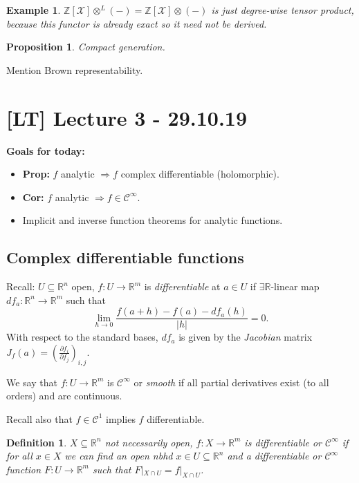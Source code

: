 \documentclass[12pt]{article}
\theoremstyle{darkgreentheorem}
\newtheorem{prop}[thm]{Proposition}
\theoremstyle{darkbluedefinition}
\newtheorem{defn}[thm]{Definition}
\theoremstyle{darkredexample}
\newtheorem{exa}[thm]{Example}
\theoremstyle{remark}
\newcommand{\Z}{\mathbb{Z}}
\newcommand{\R}{\mathbb{R}}
\newcommand{\1}{\mathbbm{1}}
\newcommand{\calC}{\mathcal{C}}
\newcommand{\X}{\mathcal{X}}
\newcommand{\ot}{\otimes}
\begin{document}
\begin{exa}
    $\Z[\X]\ot^{L}(-)=\Z[\X]\ot(-)$ is just degree-wise tensor product, because this functor is already exact so it need not be derived.
\end{exa}

\begin{prop}
    Compact generation.
\end{prop}

Mention Brown representability.

\section{[LT] Lecture 3 - 29.10.19}

\textbf{Goals for today:}
\begin{itemize}
    \item \textbf{Prop:} $f$ analytic $\Rightarrow f$ complex differentiable (holomorphic).
    \item \textbf{Cor:} $f$ analytic $\Rightarrow f\in \calC^{\infty}$.
    \item Implicit and inverse function theorems for analytic functions.
\end{itemize}

\subsection{Complex differentiable functions}

Recall: $U\subseteq \R^{n}$ open, $f\colon U\to \R^{m}$ is \textit{differentiable} at $a\in U$ if $\exists \R$-linear map $df_{a}\colon \R^{n}\to \R^{m}$ such that
\[ \lim_{h\to 0}\frac{f(a+h)-f(a)-df_{a}(h)}{|h|}=0.\]
With respect to the standard bases, $df_{a}$ is given by the \textit{Jacobian} matrix $J_{f}(a)=(\frac{\partial f_{i}}{\partial f_{j}})_{i,j}$.

We say that $f\colon U\to \R^{m}$ is $\calC^{\infty}$ or \textit{smooth} if all partial derivatives exist (to all orders) and are continuous.

Recall also that $f\in \calC^{1}$ implies $f$ differentiable.

\begin{defn}
    $X\subseteq \R^{n}$ not necessarily open, $f\colon X\to \R^{m}$ is \textit{differentiable} or $\calC^{\infty}$ if for all $x\in X$ we can find an open nbhd $x\in U\subseteq \R^{n}$ and a differentiable or $\calC^{\infty}$ function $F\colon U\to \R^{m}$ such that $F|_{X\cap U}=f|_{X\cap U}$.
\end{defn}
\end{document}
